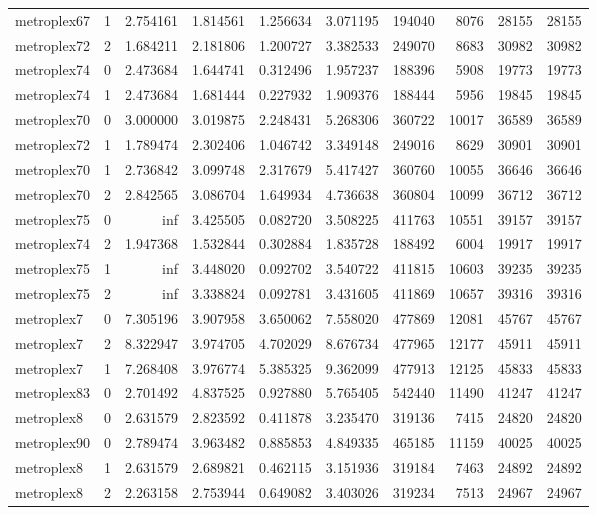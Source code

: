 \begin{longtable}{|l|r|r|r|r|r|r|r|r|r|}
metroplex67 & 1 & 2.754161 & 1.814561 & 1.256634 & 3.071195 & 194040 & 8076 & 28155 & 28155 \\
metroplex72 & 2 & 1.684211 & 2.181806 & 1.200727 & 3.382533 & 249070 & 8683 & 30982 & 30982 \\
metroplex74 & 0 & 2.473684 & 1.644741 & 0.312496 & 1.957237 & 188396 & 5908 & 19773 & 19773 \\
metroplex74 & 1 & 2.473684 & 1.681444 & 0.227932 & 1.909376 & 188444 & 5956 & 19845 & 19845 \\
metroplex70 & 0 & 3.000000 & 3.019875 & 2.248431 & 5.268306 & 360722 & 10017 & 36589 & 36589 \\
metroplex72 & 1 & 1.789474 & 2.302406 & 1.046742 & 3.349148 & 249016 & 8629 & 30901 & 30901 \\
metroplex70 & 1 & 2.736842 & 3.099748 & 2.317679 & 5.417427 & 360760 & 10055 & 36646 & 36646 \\
metroplex70 & 2 & 2.842565 & 3.086704 & 1.649934 & 4.736638 & 360804 & 10099 & 36712 & 36712 \\
metroplex75 & 0 & inf & 3.425505 & 0.082720 & 3.508225 & 411763 & 10551 & 39157 & 39157 \\
metroplex74 & 2 & 1.947368 & 1.532844 & 0.302884 & 1.835728 & 188492 & 6004 & 19917 & 19917 \\
metroplex75 & 1 & inf & 3.448020 & 0.092702 & 3.540722 & 411815 & 10603 & 39235 & 39235 \\
metroplex75 & 2 & inf & 3.338824 & 0.092781 & 3.431605 & 411869 & 10657 & 39316 & 39316 \\
metroplex7 & 0 & 7.305196 & 3.907958 & 3.650062 & 7.558020 & 477869 & 12081 & 45767 & 45767 \\
metroplex7 & 2 & 8.322947 & 3.974705 & 4.702029 & 8.676734 & 477965 & 12177 & 45911 & 45911 \\
metroplex7 & 1 & 7.268408 & 3.976774 & 5.385325 & 9.362099 & 477913 & 12125 & 45833 & 45833 \\
metroplex83 & 0 & 2.701492 & 4.837525 & 0.927880 & 5.765405 & 542440 & 11490 & 41247 & 41247 \\
metroplex8 & 0 & 2.631579 & 2.823592 & 0.411878 & 3.235470 & 319136 & 7415 & 24820 & 24820 \\
metroplex90 & 0 & 2.789474 & 3.963482 & 0.885853 & 4.849335 & 465185 & 11159 & 40025 & 40025 \\
metroplex8 & 1 & 2.631579 & 2.689821 & 0.462115 & 3.151936 & 319184 & 7463 & 24892 & 24892 \\
metroplex8 & 2 & 2.263158 & 2.753944 & 0.649082 & 3.403026 & 319234 & 7513 & 24967 & 24967 \\

\end{longtable}

